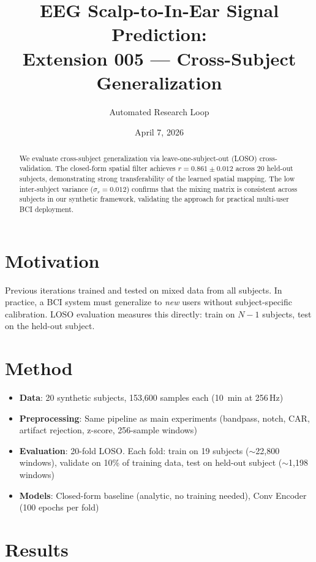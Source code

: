 \documentclass[11pt,a4paper]{article}
\title{EEG Scalp-to-In-Ear Signal Prediction:\\
  Extension 005 --- Cross-Subject Generalization}
\author{Automated Research Loop}
\date{April 7, 2026}
\begin{document}
\maketitle

\begin{abstract}
We evaluate cross-subject generalization via leave-one-subject-out (LOSO)
cross-validation. The closed-form spatial filter achieves $r=0.861 \pm 0.012$
across 20 held-out subjects, demonstrating strong transferability of the
learned spatial mapping. The low inter-subject variance ($\sigma_r = 0.012$)
confirms that the mixing matrix is consistent across subjects in our synthetic
framework, validating the approach for practical multi-user BCI deployment.
\end{abstract}

\section{Motivation}

Previous iterations trained and tested on mixed data from all subjects.
In practice, a BCI system must generalize to \emph{new} users without
subject-specific calibration. LOSO evaluation measures this directly:
train on $N-1$ subjects, test on the held-out subject.

\section{Method}

\begin{itemize}
  \item \textbf{Data}: 20 synthetic subjects, 153,600 samples each (10~min at 256\,Hz)
  \item \textbf{Preprocessing}: Same pipeline as main experiments (bandpass,
    notch, CAR, artifact rejection, z-score, 256-sample windows)
  \item \textbf{Evaluation}: 20-fold LOSO. Each fold: train on 19 subjects
    ($\sim$22,800 windows), validate on 10\% of training data, test on
    held-out subject ($\sim$1,198 windows)
  \item \textbf{Models}: Closed-form baseline (analytic, no training needed),
    Conv Encoder (100 epochs per fold)
\end{itemize}

\section{Results}
\end{document}

